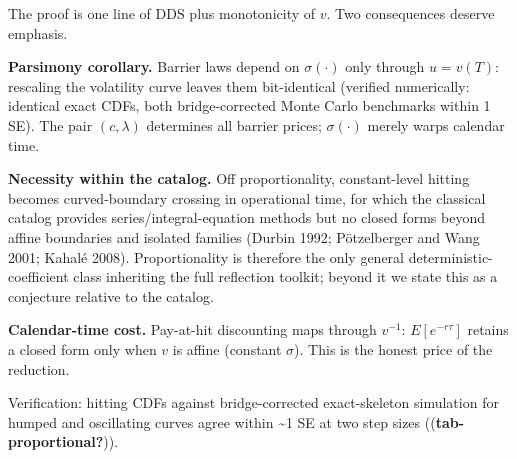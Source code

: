 \documentclass[
  english,
  10pt,
  letterpaper,
  DIV=11,
  numbers=noendperiod]{scrartcl}
\begin{document}
The proof is one line of DDS plus monotonicity of \(v\). Two
consequences deserve emphasis.

\textbf{Parsimony corollary.} Barrier laws depend on \(\sigma(\cdot)\)
only through \(u=v(T)\): rescaling the volatility curve leaves them
bit-identical (verified numerically: identical exact CDFs, both
bridge-corrected Monte Carlo benchmarks within 1 SE). The pair
\((c,\lambda)\) determines all barrier prices; \(\sigma(\cdot)\) merely
warps calendar time.

\textbf{Necessity within the catalog.} Off proportionality,
constant-level hitting becomes curved-boundary crossing in operational
time, for which the classical catalog provides series/integral-equation
methods but no closed forms beyond affine boundaries and isolated
families (Durbin 1992; Pötzelberger and Wang 2001; Kahalé 2008).
Proportionality is therefore the only general deterministic-coefficient
class inheriting the full reflection toolkit; beyond it we state this as
a conjecture relative to the catalog.

\textbf{Calendar-time cost.} Pay-at-hit discounting maps through
\(v^{-1}\): \(E[e^{-r\tau}]\) retains a closed form only when \(v\) is
affine (constant \(\sigma\)). This is the honest price of the reduction.

Verification: hitting CDFs against bridge-corrected exact-skeleton
simulation for humped and oscillating curves agree within
\textasciitilde1 SE at two step sizes ((\textbf{tab-proportional?})).
\end{document}
